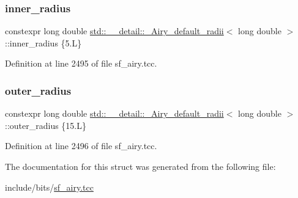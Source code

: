 \subsubsection{\texorpdfstring{inner\+\_\+radius}{inner\_radius}}
{\footnotesize\ttfamily constexpr long double \hyperlink{structstd_1_1____detail_1_1__Airy__default__radii}{std\+::\+\_\+\+\_\+detail\+::\+\_\+\+Airy\+\_\+default\+\_\+radii}$<$ long double $>$\+::inner\+\_\+radius \{5.\+L\}\hspace{0.3cm}{\ttfamily [static]}}



Definition at line 2495 of file sf\+\_\+airy.\+tcc.

\mbox{\label{structstd_1_1____detail_1_1__Airy__default__radii_3_01long_01double_01_4_ab46784c2c76dc0f43aeb85d22f8b21a7}} 
\subsubsection{\texorpdfstring{outer\+\_\+radius}{outer\_radius}}
{\footnotesize\ttfamily constexpr long double \hyperlink{structstd_1_1____detail_1_1__Airy__default__radii}{std\+::\+\_\+\+\_\+detail\+::\+\_\+\+Airy\+\_\+default\+\_\+radii}$<$ long double $>$\+::outer\+\_\+radius \{15.\+L\}\hspace{0.3cm}{\ttfamily [static]}}



Definition at line 2496 of file sf\+\_\+airy.\+tcc.



The documentation for this struct was generated from the following file\+:\begin{DoxyCompactItemize}
\item 
include/bits/\hyperlink{sf__airy_8tcc}{sf\+\_\+airy.\+tcc}\end{DoxyCompactItemize}
